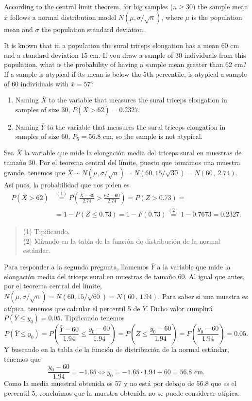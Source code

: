 {According to the central limit theorem, for big samples ($n\geq 30$) the sample mean $\bar x$ follows a normal
distribution model $N(\mu,\sigma/\sqrt{n})$, where $\mu$ is the population mean and $\sigma$ the population standard
deviation.

It is known that in a population the sural triceps elongation has a mean $60$ cm and a standard deviation $15$ cm. 
If you draw a sample of 30 individuals from this population, what is the probability of having a sample mean greater
than 62 cm?
If a sample is atypical if its mean is below the 5th percentile, is atypical a sample of 60 individuals with $\bar
x=57$?
}
{
\begin{enumerate}
\item Naming $\bar X$ to the variable that measures the sural triceps elongation in samples of size 30, $P(\bar X>62)=0.2327$.
\item Naming $\bar Y$ to the variable that measures the sural triceps elongation in samples of size 60, $P_5=56.8$ cm, so the sample is not atypical.
\end{enumerate}
}
{Sea $\bar X$ la variable que mide la elongación media del triceps sural en muestras de tamaño 30. Por el teorema central del límite,
puesto que tomamos una muestra grande, tenemos que $\bar X\sim N(\mu,\sigma/\sqrt{n})=N(60,15/\sqrt{30})=N(60\,,\,2.74)$. Así pues, la
probabilidad que nos piden es
\begin{align*}
P(\bar X>62)& \stackrel{(1)}{=} P\left(\frac{\bar X-60}{2.74}>\frac{62-60}{2.74}\right)= P(Z>0.73) =\\
&= 1 - P(Z\leq 0.73)=1-F(0.73)\stackrel{(2)}{=}1-0.7673=0.2327.
\end{align*}
\begin{quote}
    \footnotesize
    (1) Tipificando.\\
    (2) Mirando en la tabla de la función de distribución de la normal estándar.
\end{quote}

Para responder a la segunda pregunta, llamemos $\bar Y$ a la variable que mide la elongación media del triceps sural en muestras de tamaño
60. Al igual que antes, por el teorema central del límite, $N(\mu,\sigma/\sqrt{n})=N(60,15/\sqrt{60})=N(60\,,\,1.94)$. Para saber si una
muestra es atípica, tenemos que calcular el percentil 5 de $\bar Y$.
Dicho valor cumplirá $P(\bar Y\leq y_0)=0.05$. Tipificando tenemos
\[
P(\bar Y\leq y_0)=
P\left(\frac{\bar Y-60}{1.94}\leq\frac{y_0-60}{1.94}\right)=
P\left(Z\leq\frac{y_0-60}{1.94}\right)=F\left(\frac{y_0-60}{1.94}\right)=0.05.
\]
Y buscando en la tabla de la función de distribución de la normal estándar, tenemos que
\[
\frac{y_0-60}{1.94}=-1.65 \Leftrightarrow y_0=-1.65\cdot 1.94+60= 56.8 \text{ cm}.
\]
Como la media muestral obtenida es 57 y no está por debajo de $56.8$ que es el percentil 5, concluimos que la muestra obtenida no se puede
considerar atípica. 
}


